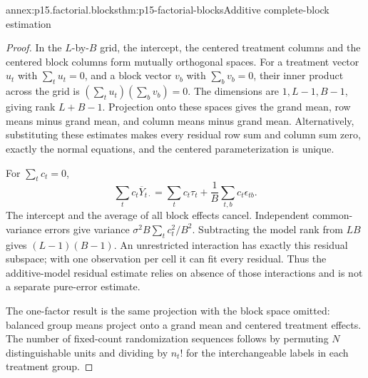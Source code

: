 \begin{annexitem}{annex:p15.factorial.blocks}{thm:p15-factorial-blocks}{Additive complete-block estimation}
\begin{proof}
In the \(L\)-by-\(B\) grid, the intercept, the centered treatment
columns and the centered block columns form mutually orthogonal spaces.
For a treatment vector \(u_t\) with \(\sum_tu_t=0\), and a block
vector \(v_b\) with \(\sum_bv_b=0\), their inner product across the
grid is \((\sum_tu_t)(\sum_bv_b)=0\). The dimensions are
\(1,L-1,B-1\), giving rank \(L+B-1\).
Projection onto these spaces gives the grand mean, row means minus grand
mean, and column means minus grand mean. Alternatively, substituting these
estimates makes every residual row sum and column sum zero, exactly the
normal equations, and the centered parameterization is unique.

For \(\sum_tc_t=0\),
\[
 \sum_tc_t\overline Y_{t\cdot}
 =\sum_tc_t\tau_t+\frac1B\sum_{t,b}c_t\epsilon_{tb}.
\]
The intercept and the average of all block effects cancel. Independent
common-variance errors give variance
\(\sigma^2 B\sum_tc_t^2/B^2\). Subtracting the model rank from
\(LB\) gives \((L-1)(B-1)\). An unrestricted interaction has exactly
this residual subspace; with one observation per cell it can fit every
residual. Thus the additive-model residual estimate relies on absence of
those interactions and is not a separate pure-error estimate.

The one-factor result is the same projection with the block space omitted:
balanced group means project onto a grand mean and centered treatment
effects. The number of fixed-count randomization sequences follows by
permuting \(N\) distinguishable units and dividing by \(n_t!\) for
the interchangeable labels in each treatment group.
\end{proof}
\end{annexitem}

